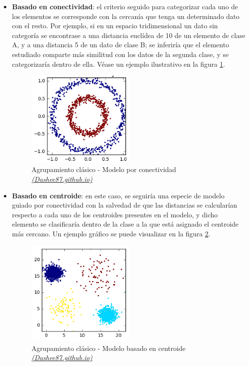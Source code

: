 \documentclass[]{report}
\begin{document}
			\begin{itemize}
				\item \textbf{Basado en conectividad}: el criterio seguido para categorizar cada uno de los elementos se corresponde con la cercanía que tenga un determinado dato con el resto. Por ejemplo, si en un espacio tridimensional un dato sin categoría se encontrase a una distancia euclídea de 10 de un elemento de clase A, y a una distancia 5 de un dato de clase B; se inferiría que el elemento estudiado comparte más similitud con los datos de la segunda clase, y se categorizaría dentro de ella. Véase un ejemplo ilustrativo en la figura \ref{clustering-conectividad}.
				
				\begin{figure}[h!]
					\centering
					\includegraphics[width=0.5\textwidth]{clustering_conectividad.png}
					\caption{Agrupamiento clásico - Modelo por conectividad \href{https://dashee87.github.io/images/scikit_clustering_13_1.png}{ \textit{(Dashee87.github.io)}}}
					\label{clustering-conectividad}
				\end{figure}
				
				\item \textbf{Basado en centroide}: en este caso, se seguiría una especie de modelo guiado por conectividad con la salvedad de que las distancias se calcularían respecto a cada uno de los centroides presentes en el modelo, y dicho elemento se clasificaría dentro de la clase a la que está asignado el centroide más cercano. Un ejemplo gráfico se puede visualizar en la figura \ref{clustering-centroide}.
				
				\begin{figure}[h!]
					\centering
					\includegraphics[width=0.5\textwidth]{clustering_centroide.png}
					\caption{Agrupamiento clásico - Modelo basado en centroide \href{https://dashee87.github.io/images/scikit_clustering_5_0.png}{ \textit{(Dashee87.github.io)}}}
					\label{clustering-centroide}
				\end{figure}
			

\end{itemize}
\end{document}
